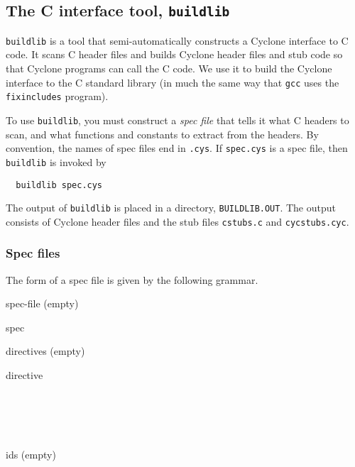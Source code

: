 \subsection{The C interface tool, \texttt{buildlib}}

\texttt{buildlib} is a tool that semi-automatically constructs a
Cyclone interface to C code.  It scans C header files and builds
Cyclone header files and stub code so that Cyclone programs can call
the C code.  We use it to build the Cyclone interface to the C
standard library (in much the same way that \texttt{gcc} uses the
\texttt{fixincludes} program).

To use \texttt{buildlib}, you must construct a \emph{spec file} that
tells it what C headers to scan, and what functions and constants to
extract from the headers.  By convention, the names of spec files end
in \texttt{.cys}.  If \texttt{spec.cys} is a spec file, then
\texttt{buildlib} is invoked by
\begin{verbatim}
  buildlib spec.cys
\end{verbatim}
The output of \texttt{buildlib} is placed in a directory,
\texttt{BUILDLIB.OUT}.  The output consists of Cyclone header files
and the stub files \texttt{cstubs.c} and \texttt{cycstubs.cyc}.  

\subsubsection*{Spec files}

The form of a spec file is given by the following grammar.

\begin{rules}{spec-file}
  (empty)\\
   
\end{rules}
\begin{rules}{spec}
   \tk{:}  \tk{;}
\end{rules}
\begin{rules}{directives}
  (empty)\\
   
\end{rules}
\begin{rules}{directive}
 \tk{\lb}  \tk{\rb} \\
 \tk{\lb}  \tk{\rb} \\
 \opt \tk{\lb}  \tk{\rb} \\
 \opt \tk{\lb}  \tk{\rb} \\
 \opt \tk{\lb}  \tk{\rb} \\
 \opt \tk{\lb}  \tk{\rb}
\end{rules}
\begin{rules}{ids}
  (empty)\\
   
\end{rules}

